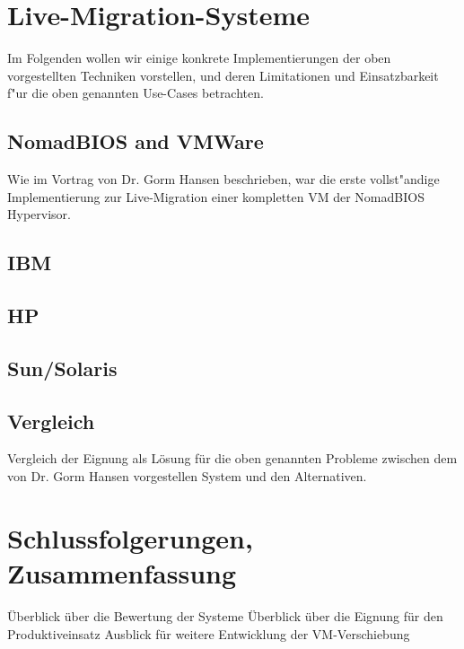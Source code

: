 \documentclass[draft,journal]{IEEEtran}
\begin{document}
\section{Live-Migration-Systeme}
Im Folgenden wollen wir einige konkrete Implementierungen der oben
vorgestellten Techniken vorstellen, und deren Limitationen und
Einsatzbarkeit f"ur die oben genannten Use-Cases betrachten.

\subsection{NomadBIOS and VMWare}
\label{sec:nomadbios--vmware}
Wie im Vortrag von Dr. Gorm Hansen beschrieben, war die erste
vollst"andige Implementierung zur Live-Migration einer kompletten VM
der NomadBIOS Hypervisor.

\subsection{IBM}

\subsection{HP}

\subsection{Sun/Solaris}

\subsection{Vergleich}
Vergleich der Eignung als Lösung für die oben genannten Probleme
zwischen dem von Dr. Gorm Hansen vorgestellen System und den Alternativen.

\section{Schlussfolgerungen, Zusammenfassung}
Überblick über die Bewertung der Systeme
Überblick über die Eignung für den Produktiveinsatz
Ausblick für weitere Entwicklung der VM-Verschiebung


\end{document}
